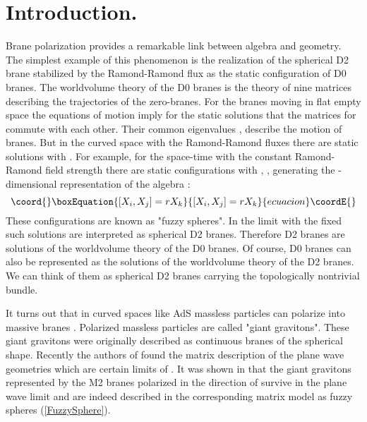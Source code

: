 \documentclass[a4paper,12pt]{article}
\begin{document}
\section{Introduction.}
Brane polarization \cite{Myers} provides a remarkable link
between algebra and geometry. The simplest example of this
phenomenon is the realization of the spherical D2 brane
stabilized by the Ramond-Ramond flux as the static configuration
of \coordHE{} D0 branes. The worldvolume theory of the \coordHE{} D0 branes
is the theory of nine \coordHE{} matrices \coordHE{} describing the
trajectories of the zero-branes\cite{BoundStates}.
For the branes moving in flat
empty space the equations of motion imply for the static
solutions that the matrices
\coordHE{} for \coordHE{} commute with each other. Their
common eigenvalues \coordHE{}, \coordHE{} describe
the motion of \coordHE{}  \coordHE{} branes.
But in the curved space with the Ramond-Ramond fluxes there
are static solutions with \coordHE{}. For example,
for the space-time with the constant Ramond-Ramond field
strength there are static configurations with \coordHE{}, \coordHE{}, \coordHE{}
generating the \coordHE{}-dimensional representation of the algebra
\coordHE{}:
\begin{equation}\coord{}\boxEquation{\label{FuzzySphere}
[X_i,X_j]=r X_k
}{[X_i,X_j]=r X_k
}{ecuacion}\coordE{}\end{equation}
These configurations are known as "fuzzy spheres".
In the limit \coordHE{} with the fixed \coordHE{} such solutions are
interpreted as spherical D2 branes. Therefore D2 branes are solutions
of the worldvolume theory of the D0 branes.
Of course, D0 branes can also be represented as the solutions of the
worldvolume theory of the D2 branes. We can think of them as spherical
D2 branes carrying the topologically nontrivial \coordHE{} bundle.


It turns out that in curved spaces like AdS massless particles
can polarize into massive branes \cite{MGST}. Polarized massless
particles are called "giant gravitons". These giant gravitons
were originally described as continuous branes of the
spherical shape.
Recently the authors of \cite{BMN} found the matrix description
of the plane wave geometries which are certain limits of
\coordHE{}. It was shown in \cite{BMN} that the giant
gravitons represented by the M2 branes polarized in the direction
of \coordHE{} survive in the  plane wave limit and are indeed described
in the corresponding matrix model as  fuzzy spheres (\ref{FuzzySphere}).
\end{document}
